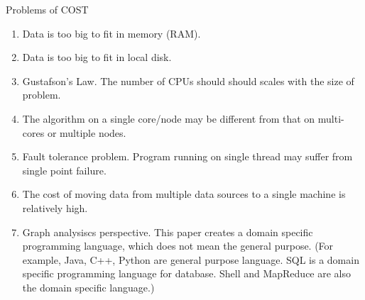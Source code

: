 \documentclass[twoside]{article}
\begin{document}
Problems of COST
\begin{enumerate}
  \item Data is too big to fit in memory (RAM).
  \item Data is too big to fit in local disk.
  \item Gustafson’s Law. The number of CPUs should should scales with the size of problem.
  \item The algorithm on a single core/node may be different from that on multi-cores or multiple nodes.
  \item Fault tolerance problem. Program running on single thread may suffer from single point failure.
  \item The cost of moving data from multiple data sources to a single machine is relatively high.
  \item Graph analysiscs perspective. This paper creates a domain specific programming language, which does not mean the general purpose. (For example, Java, C++, Python are general purpose language. SQL is a domain specific programming language for database. Shell and MapReduce are also the domain specific language.)
\end{enumerate}
\end{document}
